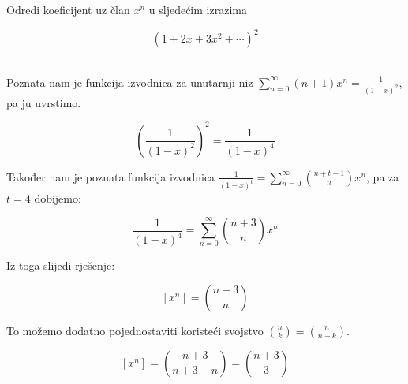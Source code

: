\documentclass[exam.tex]{subfiles}
\begin{document}
	\begin{subtask}
		Odredi koeficijent uz član \( x^n \) u sljedećim izrazima
	
		\[ (1 + 2x + 3x^2 + \cdots)^2 \] \\
	\end{subtask}
	
	Poznata nam je funkcija izvodnica za unutarnji niz \( \sum\limits^\infty_{n=0} (n + 1) x^n = \frac{1}{(1 - x)^2} \), pa ju uvrstimo.
	
	\[ \left ( \frac{1}{(1 - x)^2} \right )^2 = \frac{1}{(1 - x)^4} \]
	
	Također nam je poznata funkcija izvodnica \( \frac{1}{(1 - x)^t} = \sum\limits^\infty_{n=0} \binom{n + t - 1}{n} x^n \), pa za \( t = 4 \) dobijemo: 
	
	\[ \frac{1}{(1 - x)^4} = \sum\limits^\infty_{n=0} \binom{n + 3}{n} x^n \]
	
	Iz toga slijedi rješenje:
	
	\[ [x^n] = \binom{n + 3}{n} \]
	
	To možemo dodatno pojednostaviti koristeći svojstvo \( \binom{n}{k} = \binom{n}{n - k} \).
	
	\[ [x^n] = \binom{n + 3}{n + 3 - n} = \binom{n + 3}{3} \]
\end{document}
